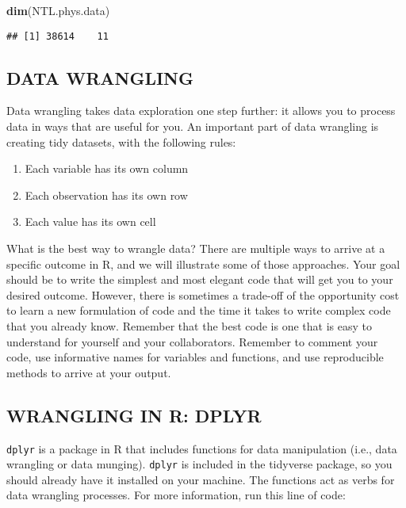 \documentclass[]{article}
\newenvironment{Shaded}{\begin{snugshade}}{\end{snugshade}}
\newcommand{\KeywordTok}[1]{\textcolor[rgb]{0.13,0.29,0.53}{\textbf{#1}}}
\newcommand{\NormalTok}[1]{#1}
\providecommand{\tightlist}{%
  \setlength{\itemsep}{0pt}\setlength{\parskip}{0pt}}
\begin{document}
\begin{Shaded}
\begin{Highlighting}[]
\KeywordTok{dim}\NormalTok{(NTL.phys.data)}
\end{Highlighting}
\end{Shaded}

\begin{verbatim}
## [1] 38614    11
\end{verbatim}

\subsection{DATA WRANGLING}\label{data-wrangling}

Data wrangling takes data exploration one step further: it allows you to
process data in ways that are useful for you. An important part of data
wrangling is creating tidy datasets, with the following rules:

\begin{enumerate}
\def\labelenumi{\arabic{enumi}.}
\tightlist
\item
  Each variable has its own column
\item
  Each observation has its own row
\item
  Each value has its own cell
\end{enumerate}

What is the best way to wrangle data? There are multiple ways to arrive
at a specific outcome in R, and we will illustrate some of those
approaches. Your goal should be to write the simplest and most elegant
code that will get you to your desired outcome. However, there is
sometimes a trade-off of the opportunity cost to learn a new formulation
of code and the time it takes to write complex code that you already
know. Remember that the best code is one that is easy to understand for
yourself and your collaborators. Remember to comment your code, use
informative names for variables and functions, and use reproducible
methods to arrive at your output.

\subsection{WRANGLING IN R: DPLYR}\label{wrangling-in-r-dplyr}

\texttt{dplyr} is a package in R that includes functions for data
manipulation (i.e., data wrangling or data munging). \texttt{dplyr} is
included in the tidyverse package, so you should already have it
installed on your machine. The functions act as verbs for data wrangling
processes. For more information, run this line of code:
\end{document}

